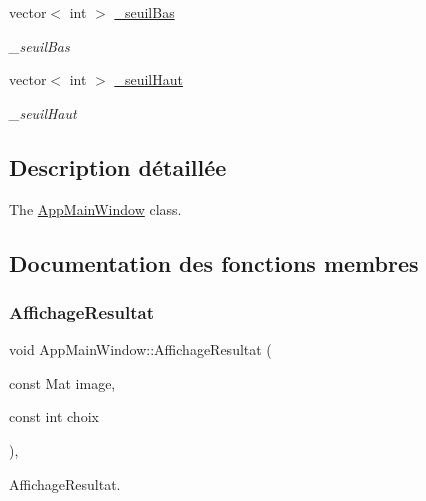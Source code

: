 \begin{DoxyCompactItemize}
\mbox{\label{classAppMainWindow_a3cb99edc0923bf4cce6b72d420d8b0c7}} 
vector$<$ int $>$ \hyperlink{classAppMainWindow_a3cb99edc0923bf4cce6b72d420d8b0c7}{\+\_\+seuil\+Bas}
\begin{DoxyCompactList}\small\item\em \+\_\+seuil\+Bas \end{DoxyCompactList}\item 
\mbox{\label{classAppMainWindow_a4f47a7096610ceef6dffb2dae47541dc}} 
vector$<$ int $>$ \hyperlink{classAppMainWindow_a4f47a7096610ceef6dffb2dae47541dc}{\+\_\+seuil\+Haut}
\begin{DoxyCompactList}\small\item\em \+\_\+seuil\+Haut \end{DoxyCompactList}\end{DoxyCompactItemize}


\subsection{Description détaillée}
The \hyperlink{classAppMainWindow}{App\+Main\+Window} class. 

\subsection{Documentation des fonctions membres}
\mbox{\label{classAppMainWindow_ad781a57c27766f8535efa0f66decb03d}} 
\subsubsection{\texorpdfstring{Affichage\+Resultat}{AffichageResultat}}
{\footnotesize\ttfamily void App\+Main\+Window\+::\+Affichage\+Resultat (\begin{DoxyParamCaption}\item[{const Mat}]{image,  }\item[{const int}]{choix }\end{DoxyParamCaption})\hspace{0.3cm}{\ttfamily [private]}, {\ttfamily [slot]}}



Affichage\+Resultat. 


